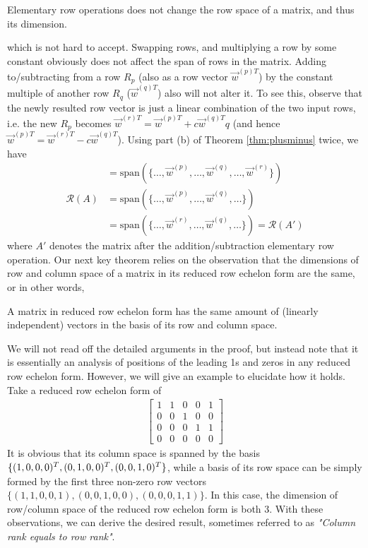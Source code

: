 \begin{proper}
\label{proper:elemrowoprowrank}
Elementary row operations does not change the row space of a matrix, and thus its dimension.
\end{proper}
which is not hard to accept. Swapping rows, and multiplying a row by some constant obviously does not affect the span of rows in the matrix. Adding to/subtracting from a row $R_p$ (also as a row vector $\vec{w}^{(p)T}$) by the constant multiple of another row $R_q$ ($\vec{w}^{(q)T}$) also will not alter it. To see this, observe that the newly resulted row vector is just a linear combination of the two input rows, i.e. the new $R_p$ becomes $\vec{w}^{(r)T} = \vec{w}^{(p)T} + c\vec{w}^{(q)T}q$ (and hence $\vec{w}^{(p)T} = \vec{w}^{(r)T} - c\vec{w}^{(q)T}$). Using part (b) of Theorem \ref{thm:plusminus} twice, we have
\begin{align*}
&= \text{span}(\{\ldots, \vec{w}^{(p)}, \ldots, \vec{w}^{(q)}, \ldots, \vec{w}^{(r)}\}) \\
\mathcal{R}(A) &= \text{span}(\{\ldots, \vec{w}^{(p)}, \ldots, \vec{w}^{(q)}, \ldots\}) \\
&= \text{span}(\{\ldots, \vec{w}^{(r)}, \ldots, \vec{w}^{(q)}, \ldots\}) = \mathcal{R}(A')
\end{align*}
where $A'$ denotes the matrix after the addition/subtraction elementary row operation. Our next key theorem relies on the observation that the dimensions of row and column space of a matrix in its reduced row echelon form are the same, or in other words,
\begin{proper}
\label{proper:rrefcolrowrank}
A matrix in reduced row echelon form has the same amount of (linearly independent) vectors in the basis of its row and column space.
\end{proper}
We will not read off the detailed arguments in the proof, but instead note that it is essentially an analysis of positions of the leading 1s and zeros in any reduced row echelon form. However, we will give an example to elucidate how it holds. Take a reduced row echelon form of
\begin{align*}
\begin{bmatrix}
1 & 1 & 0 & 0 & 1 \\
0 & 0 & 1 & 0 & 0 \\
0 & 0 & 0 & 1 & 1 \\
0 & 0 & 0 & 0 & 0 
\end{bmatrix}
\end{align*}
It is obvious that its column space is spanned by the basis $\{(1,0,0,0)^T, (0,1,0,0)^T, \\ (0,0,1,0)^T\}$, while a basis of its row space can be simply formed by the first three non-zero row vectors $\{(1,1,0,0,1), (0,0,1,0,0), (0,0,0,1,1)\}$. In this case, the dimension of row/column space of the reduced row echelon form is both $3$. With these observations, we can derive the desired result, sometimes referred to as \textit{"Column rank equals to row rank"}.
